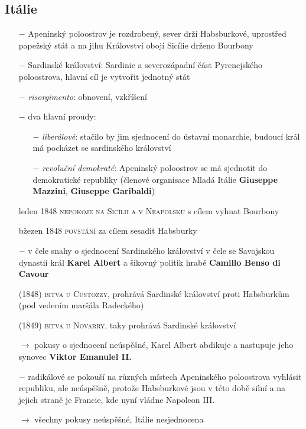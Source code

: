 \documentclass{article}
\begin{document}
\subsection*{Itálie}
\begin{itemize}
    \vspace{-0.5em}
    \setlength\itemsep{0.15em}
    \item[$-$] Apeninský poloostrov je rozdrobený, sever drží Habsburkové, uprostřed papežský stát a na jihu Království obojí Sicílie drženo Bourbony
    \item[$-$] Sardinské království: Sardinie a severozápadní část Pyrenejského poloostrova, hlavní cíl je vytvořit jednotný stát
    \item[$-$] \textit{risorgimento}: obnovení, vzkříšení
    \item[$-$] dva hlavní proudy:
    \begin{itemize}
        \vspace{-0.5em}
        \setlength\itemsep{0.15em}
        \item[$-$] \textit{liberálové}: stačilo by jim sjednocení do ústavní monarchie, budoucí král má pocházet se sardinského království
        \item[$-$] \textit{revoluční demokraté}: Apeninský poloostrov se má sjednotit do demokratické republiky (členové organisace Mladá Itálie \textbf{Giuseppe Mazzini}, \textbf{Giuseppe Garibaldi})
    \end{itemize}
    \item[leden 1848] \textsc{nepokoje na Sicílii a v Neapolsku} s cílem vyhnat Bourbony
    \item[bžezen 1848] \textsc{povstání} za cílem sesadit Habsburky
    \item[$-$] v čele snahy o sjednocení Sardinského království v čele se Savojskou dynastií král \textbf{Karel Albert} a šikovný politik hrabě \textbf{Camillo Benso di Cavour}
    \item[(1848)] \textsc{bitva u Custozzy}, prohrává Sardinské království proti Habsburkům (pod vedením maršála Radeckého)
    \item[(1849)] \textsc{bitva u Novarry}, taky prohrává Sardinské království
    \item[$\rightarrow$] pokusy o sjednocení neúspěšné, Karel Albert abdikuje a nastupuje jeho synovec \textbf{Viktor Emanulel II.}
    \item[$-$] radikálové se pokouší na různých místech Apeninského poloostrova vyhlásit republiku, ale neúspěšně, protože Habsburkové jsou v této době silní a na jejich straně je Francie, kde nyní vládne Napoleon III.
    \item[$\rightarrow$] všechny pokusy neúspěšné, Itálie nesjednocena
\end{itemize}
\end{document}
